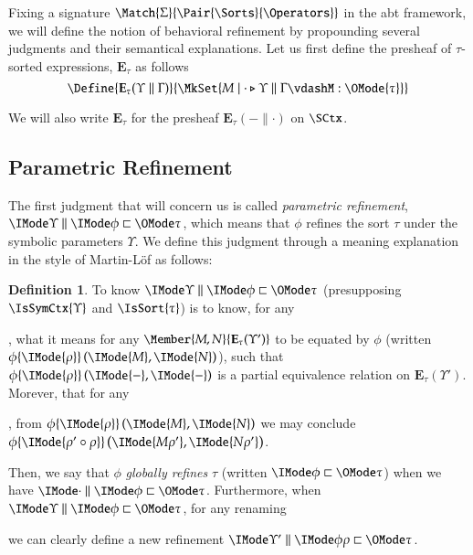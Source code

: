 \documentclass[11pt]{article}
\theoremstyle{definition}
\newtheorem{definition}[thm]{Definition}
\theoremstyle{remark}
\numberwithin{equation}{section}
\newcommand\IsAbtUnmoded[5]{
  #1\triangleright%
  #2\parallel%
  #3\vdash%
  #4:\OMode{#5}%
}
\newcommand\Exprs{\mathbf{E}}
\begin{document}
Fixing a signature $\Match{\Sigma}{\Pair{\Sorts}{\Operators}}$ in the abt
framework, we will define the notion of behavioral refinement by propounding
several judgments and their semantical explanations. Let us first define the
presheaf of $\tau$-sorted expressions, $\Exprs_\tau$ as follows
\[
  \Define{
    \Exprs_\tau(\Upsilon\parallel\Gamma)
  }{
    \MkSet{M \mid \IsAbtUnmoded{\cdot}{\Upsilon}{\Gamma}{M}{\tau}}
  }
\]

We will also write $\Exprs_\tau$ for the presheaf $\Exprs_\tau(-\parallel\cdot)$ on $\SCtx$.

\subsection{Parametric Refinement}

The first judgment that will concern us is called \emph{parametric refinement},
$\Refines{\Upsilon}{\phi}{\tau}$, which means that $\phi$ refines the sort
$\tau$ under the symbolic parameters $\Upsilon$. We define this judgment
through a meaning explanation in the style of Martin-L\"of as follows:

\newcommand\RefEquate[4]{#1\{\IMode{#2}\}\left(\IMode{#3},\IMode{#4}\right)}

\begin{definition}
  To know $\Refines{\Upsilon}{\phi}{\tau}$ (presupposing $\IsSymCtx{\Upsilon}$
  and $\IsSort{\tau}$) is to know, for any
  ,
  what it means for any $\Member{M,N}{\Exprs_\tau(\Upsilon')}$ to be equated by
  $\phi$ (written $\RefEquate{\phi}{\rho}{M}{N}$), such that
  $\RefEquate{\phi}{\rho}{-}{-}$ is a partial equivalence relation on
  $\Exprs_\tau(\Upsilon')$. Morever, that for any
  ,
  from $\RefEquate{\phi}{\rho}{M}{N}$ we may conclude
  $\RefEquate{\phi}{\rho'\circ\rho}{M\rho'}{N\rho'}$.
\end{definition}

Then, we say that $\phi$ \emph{globally refines} $\tau$ (written
$\GloballyRefines{\phi}{\tau}$) when we have $\Refines{\cdot}{\phi}{\tau}$.
Furthermore, when $\Refines{\Upsilon}{\phi}{\tau}$, for any renaming
we can clearly define a new refinement $\Refines{\Upsilon'}{\phi\rho}{\tau}$.
\end{document}
